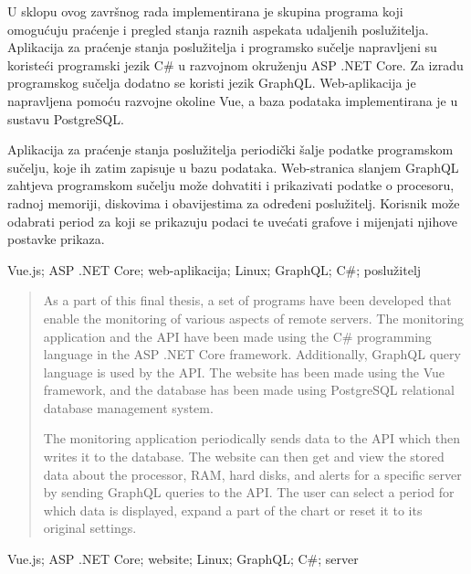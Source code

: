 \documentclass[zavrsnirad]{fer}
\begin{document}
\begin{sazetak}
	U sklopu ovog završnog rada implementirana je skupina programa koji omogućuju praćenje i pregled stanja raznih aspekata udaljenih poslužitelja. Aplikacija za praćenje stanja poslužitelja i programsko sučelje napravljeni su koristeći programski jezik C\# u razvojnom okruženju ASP .NET Core. Za izradu programskog sučelja dodatno se koristi jezik GraphQL. Web-aplikacija je napravljena pomoću razvojne okoline Vue, a baza podataka implementirana je u sustavu PostgreSQL.
	
	Aplikacija za praćenje stanja poslužitelja periodički šalje podatke programskom sučelju, koje ih zatim zapisuje u bazu podataka. Web-stranica slanjem GraphQL zahtjeva programskom sučelju može dohvatiti i prikazivati podatke o procesoru, radnoj memoriji, diskovima i obavijestima za određeni poslužitelj. Korisnik može odabrati period za koji se prikazuju podaci te uvećati grafove i mijenjati njihove postavke prikaza.
\end{sazetak}

\begin{kljucnerijeci}
  Vue.js; ASP .NET Core; web-aplikacija; Linux; GraphQL; C\#; poslužitelj
\end{kljucnerijeci}


\begin{abstract}
	As a part of this final thesis, a set of programs have been developed that enable the monitoring of various aspects of remote servers. The monitoring application and the API have been made using the C\# programming language in the ASP .NET Core framework. Additionally, GraphQL query language is used by the API. The website has been made using the Vue framework, and the database has been made using PostgreSQL relational database management system.
	
	The monitoring application periodically sends data to the API which then writes it to the database. The website can then get and view the stored data about the processor, RAM, hard disks, and alerts for a specific server by sending GraphQL queries to the API. The user can select a period for which data is displayed, expand a part of the chart or reset it to its original settings.
\end{abstract}

\begin{keywords}
	Vue.js; ASP .NET Core; website; Linux; GraphQL; C\#; server
\end{keywords}
\end{document}
